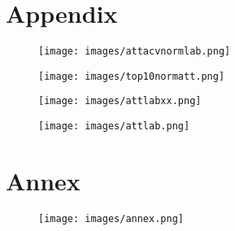 \chapter*{Appendix}
\begin{figure}[tbh]
	\begin{center}
		\texttt{[image: images/attacvnormlab.png]}
	\end{center}
\end{figure}
\begin{figure}[H]
	\begin{center}
		\texttt{[image: images/top10normatt.png]}
	\end{center}
\end{figure}
\begin{figure}[H]
	\begin{center}
		\texttt{[image: images/attlabxx.png]}
	\end{center}
\end{figure}
\begin{figure}[H]
	\begin{center}
		\texttt{[image: images/attlab.png]}
	\end{center}
\end{figure}

\chapter*{Annex}
\begin{figure}[tbh]
	\begin{center}
		\texttt{[image: images/annex.png]}
	\end{center}
\end{figure}

